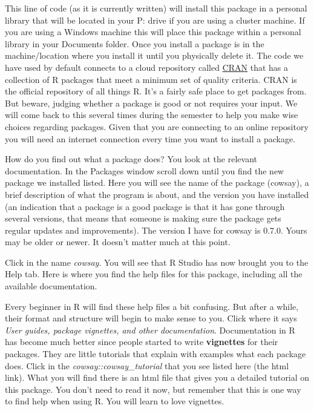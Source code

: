 \documentclass[]{book}
\theoremstyle{definition}
\theoremstyle{definition}
\theoremstyle{definition}
\theoremstyle{remark}
\begin{document}
This line of code (as it is currently written) will install this package
in a personal library that will be located in your P: drive if you are
using a cluster machine. If you are using a Windows machine this will
place this package within a personal library in your Documents folder.
Once you install a package is in the machine/location where you install
it until you physically delete it. The code we have used by default
connects to a cloud repository called
\href{https://cran.r-project.org/}{CRAN} that has a collection of R
packages that meet a minimum set of quality criteria. CRAN is the
official repository of all things R. It's a fairly safe place to get
packages from. But beware, judging whether a package is good or not
requires your input. We will come back to this several times during the
semester to help you make wise choices regarding packages. Given that
you are connecting to an online repository you will need an internet
connection every time you want to install a package.

How do you find out what a package does? You look at the relevant
documentation. In the Packages window scroll down until you find the new
package we installed listed. Here you will see the name of the package
(cowsay), a brief description of what the program is about, and the
version you have installed (an indication that a package is a good
package is that it has gone through several versions, that means that
someone is making sure the package gets regular updates and
improvements). The version I have for cowsay is 0.7.0. Yours may be
older or newer. It doesn't matter much at this point.

Click in the name \emph{cowsay}. You will see that R Studio has now
brought you to the Help tab. Here is where you find the help files for
this package, including all the available documentation.

Every beginner in R will find these help files a bit confusing. But
after a while, their format and structure will begin to make sense to
you. Click where it says \emph{User guides, package vignettes, and other
documentation}. Documentation in R has become much better since people
started to write \textbf{vignettes} for their packages. They are little
tutorials that explain with examples what each package does. Click in
the \emph{cowsay::cowsay\_tutorial} that you see listed here (the html
link). What you will find there is an html file that gives you a
detailed tutorial on this package. You don't need to read it now, but
remember that this is one way to find help when using R. You will learn
to love vignettes.
\end{document}
